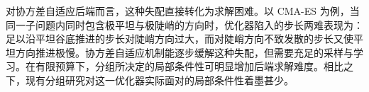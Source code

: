 对协方差自适应后端而言，这种失配直接转化为求解困难。以 CMA-ES 为例，当同一子问题内同时包含极平坦与极陡峭的方向时，优化器陷入的步长两难表现为：足以沿平坦谷底推进的步长对陡峭方向过大，而对陡峭方向不致发散的步长又使平坦方向推进极慢。协方差自适应机制能逐步缓解这种失配，但需要充足的采样与学习。在有限预算下，分组所决定的局部条件性可明显增加后端求解难度。相比之下，现有分组研究对这一优化器实际面对的局部条件性着墨甚少。